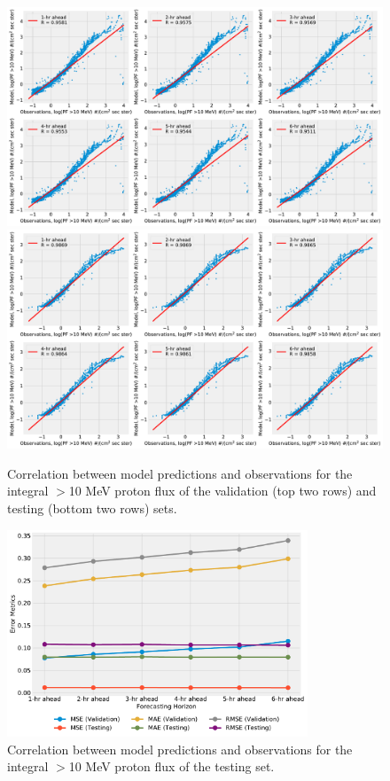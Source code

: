 \begin{figure}[!htp]
	\centering
	\includegraphics[width=\textwidth]{chapter4/figs/hourly_PF10/scatterplot_obs_vs_model_valset.pdf}
	\includegraphics[width=\textwidth]{chapter4/figs/hourly_PF10/scatterplot_obs_vs_model_tstset.pdf}
	\caption{Correlation between model predictions and observations for the integral $>$10 MeV proton flux of the validation (top two rows) and testing (bottom two rows) sets.}
	\label{fig_scatterplot_pf10_hr}
\end{figure}

\begin{figure}[!htp]
	\centering
	\includegraphics[width=0.8\textwidth]{chapter4/figs/hourly_PF10/scatter_error_metrics.pdf}
	\caption{Correlation between model predictions and observations for the integral $>$10 MeV proton flux of the testing set.}
	\label{fig_error_metrics_hr}
\end{figure}

